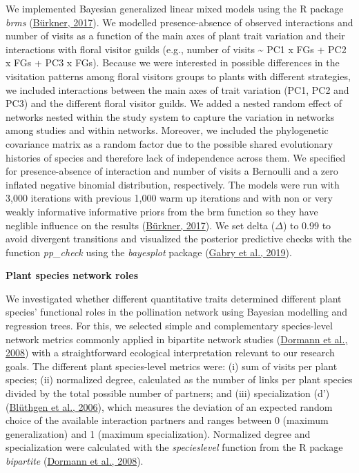 \documentclass[
  12pt,
  a4paper,
]{article}
\begin{document}
We implemented Bayesian generalized linear mixed models using the R package \emph{brms} (\protect\hyperlink{ref-burkner2017}{Bürkner, 2017}). We modelled presence-absence of observed interactions and number of visits as a function of the main axes of plant trait variation and their interactions with floral visitor guilds (e.g., number of visits \textasciitilde{} PC1 x FGs + PC2 x FGs + PC3 x FGs). Because we were interested in possible differences in the visitation patterns among floral visitors groups to plants with different strategies, we included interactions between the main axes of trait variation (PC1, PC2 and PC3) and the different floral visitor guilds. We added a nested random effect of networks nested within the study system to capture the variation in networks among studies and within networks. Moreover, we included the phylogenetic covariance matrix as a random factor due to the possible shared evolutionary histories of species and therefore lack of independence across them. We specified for presence-absence of interaction and number of visits a Bernoulli and a zero inflated negative binomial distribution, respectively. The models were run with 3,000 iterations with previous 1,000 warm up iterations and with non or very weakly informative informative priors from the brm function so they have neglible influence on the results (\protect\hyperlink{ref-burkner2017}{Bürkner, 2017}). We set delta (\(\Delta\)) to 0.99 to avoid divergent transitions and visualized the posterior predictive checks with the function \emph{pp\_check} using the \emph{bayesplot} package (\protect\hyperlink{ref-gabry2019}{Gabry et al., 2019}).

\textbf{Plant species network roles}

We investigated whether different quantitative traits determined different plant species' functional roles in the pollination network using Bayesian modelling and regression trees. For this, we selected simple and complementary species-level network metrics commonly applied in bipartite network studies (\protect\hyperlink{ref-dormann2008}{Dormann et al., 2008}) with a straightforward ecological interpretation relevant to our research goals. The different plant species-level metrics were: (i) sum of visits per plant species; (ii) normalized degree, calculated as the number of links per plant species divided by the total possible number of partners; and (iii) specialization (d') (\protect\hyperlink{ref-bluthgen2006}{Blüthgen et al., 2006}), which measures the deviation of an expected random choice of the available interaction partners and ranges between 0 (maximum generalization) and 1 (maximum specialization). Normalized degree and specialization were calculated with the \emph{specieslevel} function from the R package \emph{bipartite} (\protect\hyperlink{ref-dormann2008}{Dormann et al., 2008}).
\end{document}
